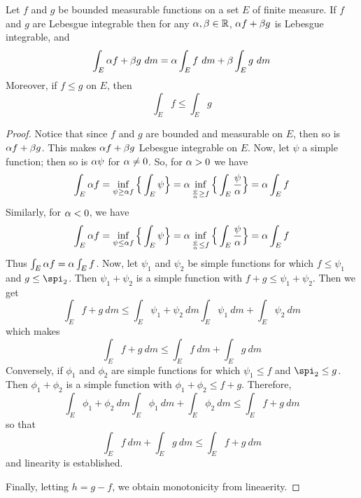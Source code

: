 \begin{theorem}\label{10.1.5}
    Let $f$ and  $g$ be bounded measurable functions on a set  $E$ of finite
    measure. If $f$ and $g$ are Lebesgue integrable then for any  $\alpha,\beta \in
    \mathbb{R}$, $\alpha{f}+\beta{g}$ is Lebesgue integrable, and
    \begin{equation*}
        \int_E{\alpha{f}+\beta{g} \ dm}=\alpha\int_E{f \ dm}+\beta\int_E{g \ dm}
    \end{equation*}
    Moreover, if $f \leq g$ on  $E$, then
    \begin{equation*}
        \int_E{f} \leq \int_E{g}
    \end{equation*}
\end{theorem}
\begin{proof}
    Notice that since $f$ and  $g$ are bounded and measurable on $E$, then so is
    $\alpha{f}+\beta{g}$. This makes $\alpha{f}+\beta{g}$ Lebesgue integrable on $E$. Now, let
    $\psi$ a simple function; then so is  $\alpha\psi$ for $\alpha \neq 0$. So, for
    $\alpha>0$ we have
    \begin{equation*}
        \int_E{\alpha{f}}=\inf_{\psi \geq \alpha{f}}{\Big{\{} \int_E{\psi} \Big{\}}}=
        \alpha\inf_{\frac{\psi}{\alpha} \geq {f}}{\Big{\{} \int_E{\frac{\psi}{\alpha}} \Big{\}}}=
        \alpha\int_E{f}
    \end{equation*}
    Similarly, for $\alpha<0$, we have
    \begin{equation*}
        \int_E{\alpha{f}}=\inf_{\psi \leq \alpha{f}}{\Big{\{} \int_E{\psi} \Big{\}}}=
        \alpha\inf_{\frac{\psi}{\alpha} \leq {f}}{\Big{\{} \int_E{\frac{\psi}{\alpha}} \Big{\}}}=
        \alpha\int_E{f}
    \end{equation*}
    Thus $\int_E{\alpha{f}}=\alpha\int_E{f}$. Now, let $\psi_1$  and $\psi_2$ be simple
    functions for which $f \leq \psi_1$ and $g \leq \spi_2$. Then
    $\psi_1+\psi_2$ is a simple function with $f+g \leq \psi_1+\psi_2$. Then we
    get
    \begin{equation*}
        \int_E{f+g \ dm} \leq \int_E{\psi_1+\psi_2 \ dm}\int_E{\psi_1  \ dm}+
                        \int_E{\psi_2 \ dm}
    \end{equation*}
    which makes
    \begin{equation*}
        \int_E{f+g \ dm} \leq \int_E{f \ dm}+\int_E{g \ dm}
    \end{equation*}
    Conversely, if $\phi_1$  and $\phi_2$ are simple functions for which
    $\psi_1 \leq f$ and $\spi_2 \leq g$. Then $\phi_1+\phi_2$ is a simple
    function with $\phi_1+\phi_2 \leq f+g$. Therefore,
    \begin{equation*}
        \int_E{\phi_1+\phi_2 \ dm}\int_E{\phi_1  \ dm}+ \int_E{\phi_2 \ dm} \leq
        \int_E{f+g \ dm}
    \end{equation*}
    so that
    \begin{equation*}
         \int_E{f \ dm}+\int_E{g \ dm} \leq \int_E{f+g \ dm}
    \end{equation*}
    and linearity is established.

    Finally, letting $h=g-f$, we obtain monotonicity from lineaerity.
\end{proof}
